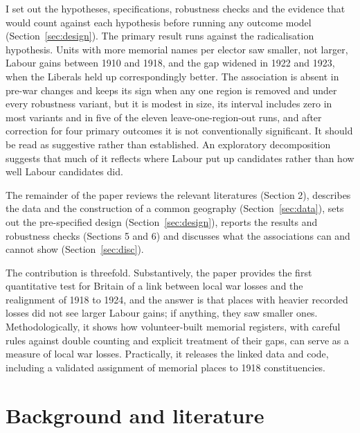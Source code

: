 \documentclass[11pt,a4paper]{article}
\begin{document}
I set out the hypotheses, specifications, robustness checks and the evidence that would count against each hypothesis before running any outcome model (Section~\ref{sec:design}). The primary result runs against the radicalisation hypothesis. Units with more memorial names per elector saw smaller, not larger, Labour gains between 1910 and 1918, and the gap widened in 1922 and 1923, when the Liberals held up correspondingly better. The association is absent in pre-war changes and keeps its sign when any one region is removed and under every robustness variant, but it is modest in size, its interval includes zero in most variants and in five of the eleven leave-one-region-out runs, and after correction for four primary outcomes it is not conventionally significant. It should be read as suggestive rather than established. An exploratory decomposition suggests that much of it reflects where Labour put up candidates rather than how well Labour candidates did.

The remainder of the paper reviews the relevant literatures (Section 2), describes the data and the construction of a common geography (Section~\ref{sec:data}), sets out the pre-specified design (Section~\ref{sec:design}), reports the results and robustness checks (Sections 5 and 6) and discusses what the associations can and cannot show (Section~\ref{sec:disc}).

The contribution is threefold. Substantively, the paper provides the first quantitative test for Britain of a link between local war losses and the realignment of 1918 to 1924, and the answer is that places with heavier recorded losses did not see larger Labour gains; if anything, they saw smaller ones. Methodologically, it shows how volunteer-built memorial registers, with careful rules against double counting and explicit treatment of their gaps, can serve as a measure of local war losses. Practically, it releases the linked data and code, including a validated assignment of memorial places to 1918 constituencies.

\section{Background and literature}
\end{document}

